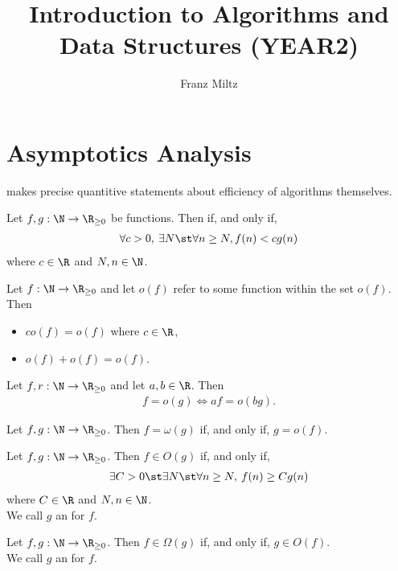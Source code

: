 \documentclass{article}
\begin{document}
\title{Introduction to Algorithms and Data Structures (YEAR2)}
\author{Franz Miltz}
\maketitle
\tableofcontents  



\section{Asymptotics Analysis}



 makes precise quantitive statements about efficiency of algorithms themselves.
\begin{definition}
	Let $f,g:\N\to\R_{\geq 0}$ be functions. Then
	 if, and only if, 
	\begin{align*}
		\forall c>0,\:\exists N\st \forall n \geq N, f(n)<cg(n)
	\end{align*}
	where $c\in\R$ and $N,n\in\N$.
\end{definition}
\begin{theorem}
	Let $f:\N\to\R_{\geq 0}$ and let $o(f)$ refer to some
	function within the set $o(f)$. Then
	\begin{itemize}
		\item $co(f)=o(f)$ where $c\in\R$,
		\item $o(f) + o(f) = o(f)$.
	\end{itemize}
\end{theorem}
\begin{theorem}
	Let $f,r:\N\to\R_{\geq 0}$ and let $a,b\in\R$. Then
	\begin{align*}
		f=o(g) \Leftrightarrow af=o(bg).	
	\end{align*}
\end{theorem}
\begin{definition}
	Let $f,g:\N\to\R_{\geq 0}$. Then $f=\omega(g)$ if, and only if, $g=o(f)$.
\end{definition}
\begin{definition}
	Let $f,g:\N\to\R_{\geq 0}$. Then $f\in O(g)$ if, and only if,
	\begin{align*}
		\exists C > 0\st \exists N \st \forall n \geq N,\: f(n) \geq Cg(n)
	\end{align*}
	where $C\in\R$ and $N,n\in\N$.\\
	We call $g$ an  for $f$.
\end{definition}
\begin{definition}
	Let $f,g:\N\to\R_{\geq 0}$. Then $f\in\Omega(g)$ if, and only if, $g\in O(f)$.\\
	We call $g$ an  for $f$.
\end{definition}
\end{document}
